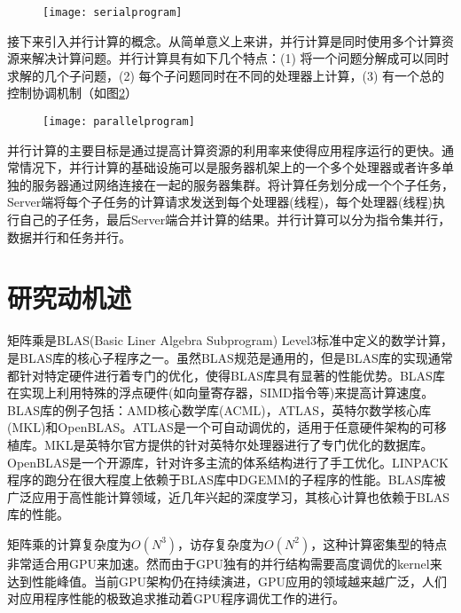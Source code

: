\begin{figure}[!htbp]
	\centering
	\texttt{[image: serialprogram]}
	\label{fig:serialprogram}
\end{figure}

接下来引入并行计算的概念。从简单意义上来讲，并行计算是同时使用多个计算资源来解决计算问题。并行计算具有如下几个特点：(1) 将一个问题分解成可以同时求解的几个子问题，(2) 每个子问题同时在不同的处理器上计算，(3) 有一个总的控制协调机制（如图\ref{fig:parallelprogram}）

\begin{figure}[!htbp]
	\centering
	\texttt{[image: parallelprogram]}
	\label{fig:parallelprogram}
\end{figure}

并行计算的主要目标是通过提高计算资源的利用率来使得应用程序运行的更快。通常情况下，并行计算的基础设施可以是服务器机架上的一个多个处理器或者许多单独的服务器通过网络连接在一起的服务器集群。将计算任务划分成一个个子任务，Server端将每个子任务的计算请求发送到每个处理器(线程)，每个处理器(线程)执行自己的子任务，最后Server端合并计算的结果。并行计算可以分为指令集并行，数据并行和任务并行。


\section{研究动机述}
矩阵乘是BLAS(Basic Liner Algebra Subprogram) Level3标准中定义的数学计算，是BLAS库的核心子程序之一。虽然BLAS规范是通用的，但是BLAS库的实现通常都针对特定硬件进行着专门的优化，使得BLAS库具有显著的性能优势。BLAS库在实现上利用特殊的浮点硬件(如向量寄存器，SIMD指令等)来提高计算速度。BLAS库的例子包括：AMD核心数学库(ACML)，ATLAS，英特尔数学核心库(MKL)和OpenBLAS。ATLAS是一个可自动调优的，适用于任意硬件架构的可移植库。MKL是英特尔官方提供的针对英特尔处理器进行了专门优化的数据库。OpenBLAS是一个开源库，针对许多主流的体系结构进行了手工优化。LINPACK程序的跑分在很大程度上依赖于BLAS库中DGEMM的子程序的性能。BLAS库被广泛应用于高性能计算领域，近几年兴起的深度学习，其核心计算也依赖于BLAS库的性能。

矩阵乘的计算复杂度为$O(N^3)$，访存复杂度为$O(N^2)$，这种计算密集型的特点非常适合用GPU来加速。然而由于GPU独有的并行结构需要高度调优的kernel来达到性能峰值。当前GPU架构仍在持续演进，GPU应用的领域越来越广泛，人们对应用程序性能的极致追求推动着GPU程序调优工作的进行。

